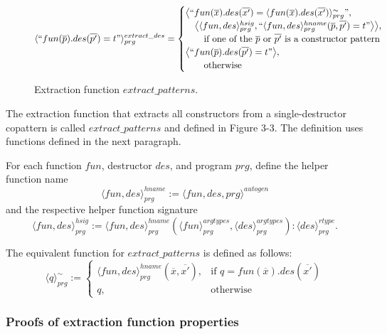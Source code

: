 \begin{figure}
\vspace{2.4in}
\[
    \langle `` fun(\overline{p}).des(\overline{p'}) = t " \rangle^{extract\_des}_{prg} =
\begin{cases}
    \big\langle `` fun(\overline{x}).des(\overline{x'}) =  \langle fun(\overline{x}).des(\overline{x'}) \rangle^{\sim}_{prg} ", \\
    \quad \big\langle \langle fun, des \rangle^{hsig}_{prg}, `` \langle fun, des \rangle^{hname}_{prg}(\overline{p}, \overline{p'}) = t  " \big\rangle \big\rangle,& \\
    \qquad \text{if one of the $\overline{p}$ or $\overline{p'}$ is a constructor pattern} \\
   \big\langle `` fun(\overline{p}).des(\overline{p'}) = t " \big\rangle,& \\
    \qquad \text{otherwise}
\end{cases}
\]
\caption{Extraction function $extract\_patterns$.}
\end{figure}

The extraction function that extracts all constructors from a single-destructor copattern is called $extract\_patterns$ and defined in Figure 3-3. The definition uses functions defined in the next paragraph.

For each function $fun$, destructor $des$, and program $prg$, define the helper function name
\begin{equation*}
\langle fun, des \rangle^{hname}_{prg} := \langle fun, des, prg \rangle^{autogen}
\end{equation*}
and the respective helper function signature
\begin{equation*}
\langle fun, des \rangle^{hsig}_{prg} := \langle fun, des \rangle^{hname}_{prg}(\langle fun \rangle^{argtypes}_{prg}, \langle des \rangle^{argtypes}_{prg}): \langle des \rangle^{rtype}_{prg}.
\end{equation*}

The equivalent function for $extract\_patterns$ is defined as follows:
\[
    \langle q \rangle^{\sim}_{prg} :=
\begin{cases}
    \langle fun, des \rangle^{hname}_{prg}(\overline{x}, \overline{x'}),& \text{if } q = fun(\overline{x}).des(\overline{x'}) \\
    q,                                                                                      & \text{otherwise}
\end{cases}
\]

\subsubsection{Proofs of extraction function properties}

